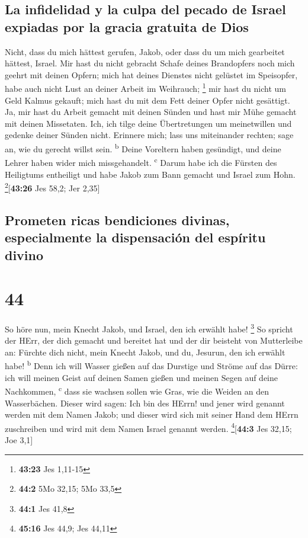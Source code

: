 \hypertarget{la-infidelidad-y-la-culpa-del-pecado-de-israel-expiadas-por-la-gracia-gratuita-de-dios}{%
\subsection{La infidelidad y la culpa del pecado de Israel expiadas por
la gracia gratuita de
Dios}\label{la-infidelidad-y-la-culpa-del-pecado-de-israel-expiadas-por-la-gracia-gratuita-de-dios}}

 Nicht, dass du mich hättest gerufen, Jakob, oder dass du
um mich gearbeitet hättest, Israel.  Mir hast du nicht
gebracht Schafe deines Brandopfers noch mich geehrt mit deinen Opfern;
mich hat deines Dienstes nicht gelüstet im Speisopfer, habe auch nicht
Lust an deiner Arbeit im Weihrauch; \footnote{\textbf{43:23} Jes 1,11-15}
 mir hast du nicht um Geld Kalmus gekauft; mich hast du
mit dem Fett deiner Opfer nicht gesättigt. Ja, mir hast du Arbeit
gemacht mit deinen Sünden und hast mir Mühe gemacht mit deinen
Missetaten.  Ich, ich tilge deine Übertretungen um
meinetwillen und gedenke deiner Sünden nicht.  Erinnere
mich; lass uns miteinander rechten; sage an, wie du gerecht willst sein.
\textsuperscript{b}  Deine Voreltern haben gesündigt, und
deine Lehrer haben wider mich missgehandelt. \textsuperscript{c}
 Darum habe ich die Fürsten des Heiligtums entheiligt und
habe Jakob zum Bann gemacht und Israel zum Hohn.
\footnote{\textbf{44:2} 5Mo 32,15; 5Mo 33,5}{[}\textbf{43:26} Jes 58,2;
Jer 2,35{]}

\hypertarget{prometen-ricas-bendiciones-divinas-especialmente-la-dispensaciuxf3n-del-espuxedritu-divino}{%
\subsection{Prometen ricas bendiciones divinas, especialmente la
dispensación del espíritu
divino}\label{prometen-ricas-bendiciones-divinas-especialmente-la-dispensaciuxf3n-del-espuxedritu-divino}}

\hypertarget{section-43}{%
\section{44}\label{section-43}}

 So höre nun, mein Knecht Jakob, und Israel, den ich
erwählt habe! \footnote{\textbf{44:1} Jes 41,8}  So
spricht der HErr, der dich gemacht und bereitet hat und der dir beisteht
von Mutterleibe an: Fürchte dich nicht, mein Knecht Jakob, und du,
Jesurun, den ich erwählt habe! \textsuperscript{b}  Denn
ich will Wasser gießen auf das Durstige und Ströme auf das Dürre: ich
will meinen Geist auf deinen Samen gießen und meinen Segen auf deine
Nachkommen, \textsuperscript{c}  dass sie wachsen sollen
wie Gras, wie die Weiden an den Wasserbächen.  Dieser wird
sagen: Ich bin des HErrn! und jener wird genannt werden mit dem Namen
Jakob; und dieser wird sich mit seiner Hand dem HErrn zuschreiben und
wird mit dem Namen Israel genannt werden. \footnote{\textbf{45:16} Jes
  44,9; Jes 44,11}{[}\textbf{44:3} Jes 32,15; Joe 3,1{]}

